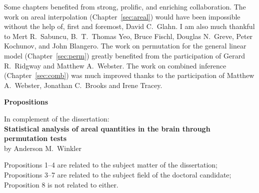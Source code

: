 \vspace{3mm}

\noindent
Some chapters benefited from strong, prolific, and enriching collaboration. The work on areal interpolation (Chapter~\ref{sec:areal}) would have been impossible without the help of, first and foremost, David C.\ Glahn. I am also much thankful to Mert R.\ Sabuncu, B.\ T.\ Thomas Yeo, Bruce Fischl, Douglas N.\ Greve, Peter Kochunov, and John Blangero. The work on permutation for the general linear model (Chapter~\ref{sec:perm}) greatly benefited from the participation of Gerard R.\ Ridgway and Matthew A.\ Webster. The work on combined inference (Chapter~\ref{sec:comb}) was much improved thanks to the participation of Matthew A.\ Webster, Jonathan C.\ Brooks and Irene Tracey.

\vspace*{\fill}

\cleardoublepage
\newpage
\vspace*{\fill}
\begin{center}
\begin{Large}
\textbf{Propositions}
\end{Large}
\end{center}

\begin{center}
\begin{footnotesize}
\noindent
In complement of the dissertation:\\
\textbf{Statistical analysis of areal quantities in the brain through permutation tests}\\
by Anderson M.\ Winkler\par
\end{footnotesize}
\end{center}

\begin{center}
\begin{footnotesize}
\noindent
Propositions 1--4 are related to the subject matter of the dissertation; Propositions 3--7 are related to the subject field of the doctoral candidate; Proposition 8 is not related to either.\par
\end{footnotesize}
\end{center}

